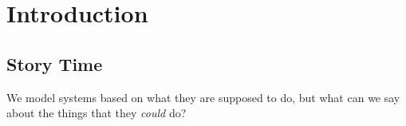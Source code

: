 
\newcommand{\branch}[3]{\ensuremath{{#2}\ {+_{#1}}\ {#3}}}
\newcommand{\iterate}[2]{\ensuremath{{#2}^{\left(#1\right)}}}
\newcommand{\bexp}[0]{\ensuremath{\text{BExp}}}
\newcommand{\gexp}[0]{\ensuremath{\text{Exp}}}
\newcommand{\usg}[0]{\ensuremath{\text{u}}}
\newcommand{\eval}[0]{\ensuremath{\mathtt{eval}}}
\newcommand{\sat}[0]{\ensuremath{\mathtt{sat}}}
\newcommand{\sg}[0]{\ensuremath{\text{s}}}
\newcommand{\set}[1]{\ensuremath{\left\{#1\right\}}}
\newcommand{\lbl}[0]{\ensuremath{\text{lbl}}}
\newcommand{\Real}[0]{\ensuremath{\mathbb{R}}}
\newcommand{\Nat}[0]{\ensuremath{\mathbb{N}}}
\newcommand{\letter}[0]{\ensuremath{\left(\text{A-Z\ |\ a-z}\right)}}
\newcommand{\Atom}[0]{\ensuremath{\text{At}}}
\newcommand{\GuardedString}[0]{\ensuremath{\text{GS}}}
\newcommand{\RC}[0]{\ensuremath{\text{RC}}}
\newcommand{\Low}[0]{\ensuremath{\text{Low}}}
\newcommand{\Variable}[0]{\ensuremath{\mathscr{V}}}
\newcommand{\Integer}[0]{\ensuremath{\mathbb{Z}}}
\newcommand{\alphanumeric}[0]{\ensuremath{\left(\text{A-Z\ |\ a-z\ |\ 0-9}\right)}}
\newcommand{\alphanumericP}[0]{\ensuremath{\left(\text{A-Z\ |\ a-z\ |\ 0-9\ |\ .\ |\ \_\ |\ \$}\right)}}
\newcommand{\semantics}[1]{\ensuremath{\llbracket #1\rrbracket}}
\newcommand{\valuation}[0]{\ensuremath{\Gamma}}
\newcommand{\timeequiv}[0]{\equiv_{\hourglass}}

\chapter{Introduction} %
\label{ch:Introduction} %


\section{Story Time}
We model systems based on what they are supposed to do, but what can we say about the things that they \emph{could} do?

